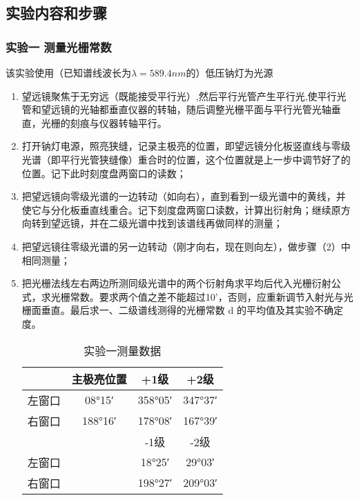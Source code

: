 \documentclass[dvipsnames, svgnames,a4paper,11pt]{article}
\begin{document}
\subsection{实验内容和步骤}

	\subsubsection{实验一 测量光栅常数}
	
	该实验使用（已知谱线波长为$\lambda=589.4nm$的）低压钠灯为光源
	\begin{enumerate}
		\item 望远镜聚焦于无穷远（既能接受平行光）,然后平行光管产生平行光,使平行光管和望远镜的光轴都垂直仪器的转轴，随后调整光栅平面与平行光管光轴垂直，光栅的刻痕与仪器转轴平行。
		
		\item 打开钠灯电源，照亮狭缝，记录主极亮的位置，即望远镜分化板竖直线与零级光谱（即平行光管狭缝像）重合时的位置，这个位置就是上一步中调节好了的位置。记下此时刻度盘两窗口的读数；
		
		\item 把望远镜向零级光谱的一边转动（如向右），直到看到一级光谱中的黄线，并使它与分化板垂直线重合。记下刻度盘两窗口读数，计算出衍射角；继续原方向转到望远镜，并在二级光谱中找到该谱线再做同样的测量；
		
		\item 把望远镜往零级光谱的另一边转动（刚才向右，现在则向左），做步骤（2）中相同测量；
		
		\item 把光栅法线左右两边所测同级光谱中的两个衍射角求平均后代入光栅衍射公式，求光栅常数。要求两个值之差不能超过10’，否则，应重新调节入射光与光栅面垂直。最后求一、二级谱线测得的光栅常数 d 的平均值及其实验不确定度。
		
	\begin{table}[htbp]
		\centering
		\begin{tabular}{|c|c|c|c|}
			\hline
			    & 主极亮位置 & +1级 & +2级 \\
			\hline
			左窗口 & 08°15′ & 358°05′ & 347°37′ \\
			\hline
			右窗口 & 188°16′ & 178°08′ & 167°39′ \\
			\hline
			    &        & -1级 & -2级 \\
			\hline
			左窗口 &      & 18°25′ & 29°03′ \\
			\hline
			右窗口 &      & 198°27′ & 209°03′ \\
			\hline
			
		\end{tabular}
		\caption{实验一测量数据}
		\label{tab:mytable}
	\end{table}
	
	\end{enumerate}
\end{document}
